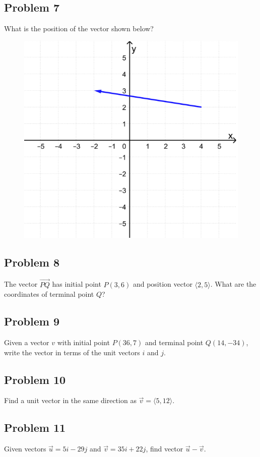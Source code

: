 \documentclass[12pt]{article}
\begin{document}
\newpage
\subsection*{Problem 7}
What is the position of the vector shown below?

\begin{figure}[!ht]
    \centering
    \includegraphics[width=0.7\linewidth]{vector_7.png}
\end{figure}

\subsection*{Problem 8}
The vector \( \overrightarrow{PQ}\) has initial point \(P(3,6)\) and position vector \(\langle 2,5 \rangle \). What are the coordinates of terminal point \(Q\)?

\subsection*{Problem 9}
Given a vector \(v\) with initial point \(P(36,7)\) and terminal point \(Q(14,-34)\), write the vector in terms of the unit vectors \(i\) and \(j\).

\subsection*{Problem 10}
Find a unit vector in the same direction as \( \vec{v} = \langle 5, 12 \rangle \).

\subsection*{Problem 11}
Given vectors \( \vec{u} = 5i - 29j \) and \( \vec{v} = 35i + 22j \), find vector \( \vec{u} - \vec{v} \).
\end{document}
